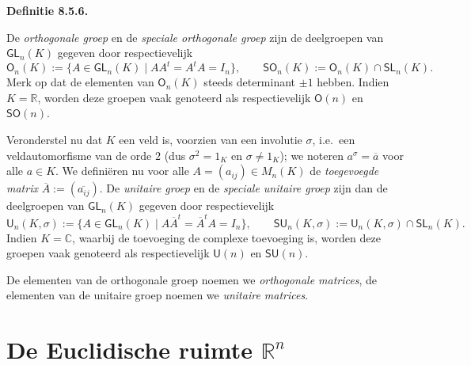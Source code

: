 \documentclass[10pt,a4paper]{article}
\newenvironment{res}[1]{%
  \par\noindent\textbf{Definitie #1.}~\ignorespaces
}{%
  \par\vspace{2pt}\normalfont
}
\begin{document}
\begin{res}{8.5.6}
De \textit{orthogonale groep} en de \textit{speciale orthogonale groep} zijn de deelgroepen van $\mathsf{GL}_n(K)$ gegeven door respectievelijk
\[
\mathsf O_n(K):=\{A\in \mathsf{GL}_n(K) \mid AA^t=A^tA=I_n\}, \qquad \mathsf{SO}_n(K):=\mathsf O_n(K)\cap \mathsf{SL}_n(K).
\]
Merk op dat de elementen van $\mathsf O_n(K)$ steeds determinant $\pm1$ hebben. Indien $K=\mathbb R$, worden deze groepen vaak genoteerd als respectievelijk $\mathsf O(n)$ en $\mathsf{SO}(n)$.

Veronderstel nu dat $K$ een veld is, voorzien van een involutie $\sigma$, i.e.\ een veldautomorfisme van de orde $2$ (dus $\sigma^2=1_K$ en $\sigma\ne1_K$); we noteren $a^\sigma=\overline a$ voor alle $a\in K$. We defini\"eren nu voor alle $A=(a_{ij})\in M_n(K)$ de \textit{toegevoegde matrix} $\overline A:=(\overline{a_{ij}})$. De \textit{unitaire groep} en de \textit{speciale unitaire groep} zijn dan de deelgroepen van $\mathsf{GL}_n(K)$ gegeven door respectievelijk
\[
\mathsf U_n(K,\sigma):=\{A\in \mathsf{GL}_n(K) \mid A\overline A^t=\overline A^tA=I_n\}, \qquad \mathsf{SU}_n(K,\sigma):=\mathsf U_n(K,\sigma)\cap \mathsf{SL}_n(K).
\]
Indien $K=\mathbb C$, waarbij de toevoeging de complexe toevoeging is, worden deze groepen vaak genoteerd als respectievelijk $\mathsf U(n)$ en $\mathsf{SU}(n)$.

De elementen van de orthogonale groep noemen we \textit{orthogonale matrices}, de elementen van de unitaire groep noemen we \textit{unitaire matrices}.
\end{res}

\section{De Euclidische ruimte $\mathbb R^n$}
\end{document}

